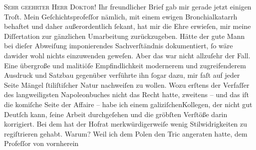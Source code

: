 \pstart{}\textsc{Sehr geehrter Herr Doktor!}\pend\vspace{0.5em}
\pstart
           Ihr freundlicher Brief gab mir gerade jetzt einigen Troſt. Mein Geſchichtsprofeſſor nämlich, mit einem
               ewigen Bronchialkatarrh behaftet und daher außerordentlich ſekant, hat mir die Ehre
               erwieſen, mir meine Diſſertation zur gänzlichen Umarbeitung zurückzugeben. Hätte der gute Mann bei dieſer Abweiſung
               imponierendes Sachverſtändnis dokumentiert, ſo wäre dawider wohl nichts einzuwenden
               geweſen. Aber das war nicht allzuſehr der Fall. Eine übergroße und malitiöſe
               Empfindlichkeit modernerem und zugreifenderem Ausdruck und Satzbau gegenüber
               verführte ihn ſogar dazu, mir faſt auf jeder Seite Mängel ſtiliſtiſcher Natur
               nachweiſen zu wollen. Wozu erſtens der Verfaſſer des langweiligsten Napoleonbuches nicht das Recht hatte,
               zweitens – und das iſt die komiſche Seite der Affaire – habe ich einem galiziſchenKollegen, der nicht gut
               Deutſch kann, ſeine Arbeit durchgeſehen und die gröbſten Verſtöße darin korrigiert.
               Bei dem hat der Hofrat
               merkwürdigerweiſe wenig Stilwidrigkeiten zu regiſtrieren gehabt. Warum? Weil ich dem
                  Polen den Tric angeraten hatte, dem Profeſſor von vornherein
